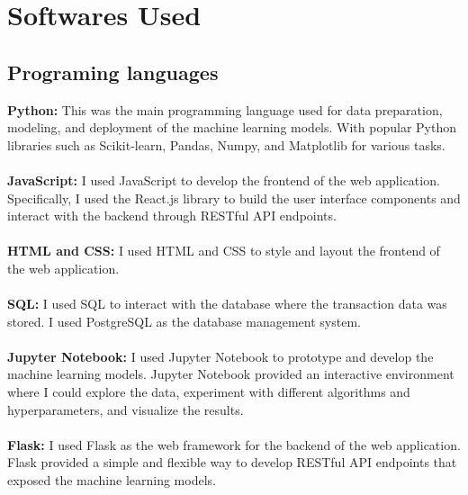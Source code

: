 \section{Softwares Used}
\subsection{Programing languages}

\textbf{Python:} This was the main programming language used for data preparation, modeling, and deployment of the machine 
learning models. With popular Python libraries such as Scikit-learn, Pandas, Numpy, and Matplotlib for various 
tasks.\\\\
\textbf{JavaScript:} I used JavaScript to develop the frontend of the web application. Specifically, I used the React.js 
library to build the user interface components and interact with the backend through RESTful API endpoints.\\\\
\textbf{HTML and CSS:} I used HTML and CSS to style and layout the frontend of the web application.\\\\
\textbf{SQL:} I used SQL to interact with the database where the transaction data was stored. I used PostgreSQL as the 
database management system.\\\\
\textbf{Jupyter Notebook:} I used Jupyter Notebook to prototype and develop the machine learning models. Jupyter Notebook 
provided an interactive environment where I could explore the data, experiment with different algorithms and 
hyperparameters, and visualize the results.\\\\
\textbf{Flask:} I used Flask as the web framework for the backend of the web application. Flask provided a simple and 
flexible way to develop RESTful API endpoints that exposed the machine learning models.\\\\
